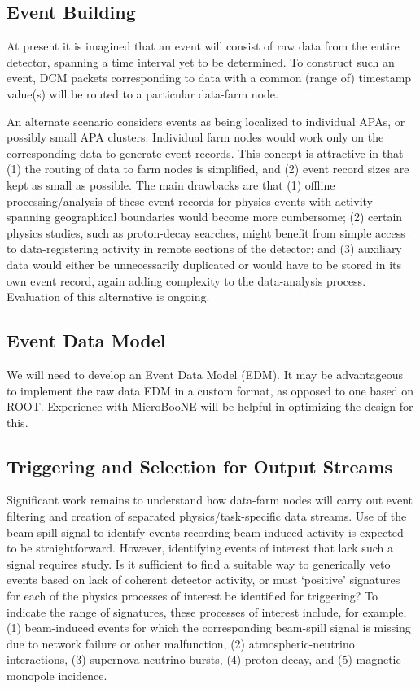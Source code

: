 \subsection{Event Building}

At present it is imagined that an event will consist of raw data from the 
entire detector, spanning a time interval yet to be determined.  To construct 
such an event, DCM packets corresponding to data with a common (range of) 
timestamp value(s) will be routed to a particular data-farm node.  

An alternate scenario considers events as being localized to individual 
APAs, or possibly small APA clusters.  Individual farm nodes would work 
only on the corresponding data to generate event records.
This concept is attractive in that (1) the routing of data to farm nodes 
is simplified, and (2) event record sizes are kept as small as possible.  
The main drawbacks are that (1) offline processing/analysis of these event 
records for physics events with activity spanning geographical 
boundaries would become more cumbersome; (2) certain physics studies, such 
as proton-decay searches, might benefit from 
simple access to data-registering activity in remote sections of the detector; and (3) auxiliary data  
would either be unnecessarily duplicated or 
would have to be stored in its own event record, again adding complexity 
to the data-analysis process.  Evaluation of this alternative is ongoing.

\subsection{Event Data Model}

We will need to develop an Event Data Model (EDM).  It may be advantageous 
to implement the raw data EDM in a custom format, as opposed to one based on 
ROOT.  Experience with MicroBooNE will be helpful in optimizing the design 
for this.

\subsection{Triggering and Selection for Output Streams}

Significant work remains to understand how data-farm nodes will carry out 
event filtering and creation of separated physics/task-specific data 
streams.  
Use of the \LBNE beam-spill signal to identify events recording 
beam-induced activity is expected to be straightforward.  However, 
identifying events of interest that lack such a signal requires study.  
Is it sufficient to find a suitable way to generically veto events based 
on lack of coherent detector activity, or must `positive' signatures for 
each of the physics processes of interest be identified for triggering?  
To indicate the range of signatures, 
these processes of interest include, for example, (1) beam-induced events 
for which the corresponding beam-spill signal is missing due to 
network failure or other malfunction, (2) atmospheric-neutrino interactions, 
(3) supernova-neutrino bursts, (4) proton decay, and (5) magnetic-monopole 
incidence.  

